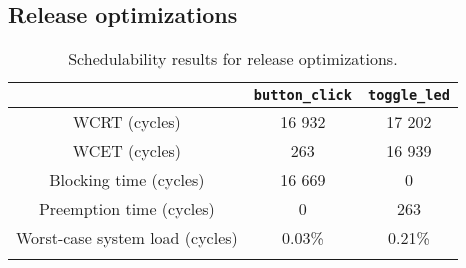 \subsection{Release optimizations}
\begin{longtable}{|c | c | c|}
    \hline
     & \texttt{button\_click} & \texttt{toggle\_led} \\
    \hline
    WCRT (cycles) & 16 932 & 17 202 \\
    \hline
    WCET (cycles) & 263 & 16 939 \\
    \hline
    Blocking time (cycles) & 16 669 & 0 \\
    \hline
    Preemption time (cycles) & 0 & 263 \\
    \hline
    Worst-case system load (cycles) & 0.03\% & 0.21\% \\
    \hline
\caption{Schedulability results for release optimizations.}
\label{tab:evalschedrelease}
\end{longtable}
